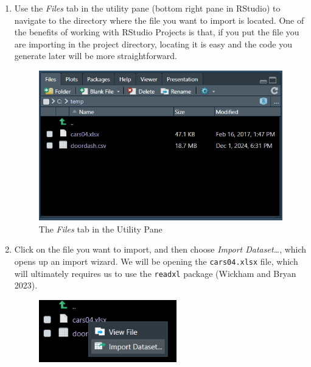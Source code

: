 \documentclass[
  letterpaper,
]{book}
\begin{document}
\begin{enumerate}
\def\labelenumi{\arabic{enumi}.}
\setcounter{enumi}{1}
\item
  Use the \emph{Files} tab in the utility pane (bottom right pane in
  RStudio) to navigate to the directory where the file you want to
  import is located. One of the benefits of working with RStudio
  Projects is that, if you put the file you are importing in the project
  directory, locating it is easy and the code you generate later will be
  more straightforward.

  \begin{figure}[H]

  {\centering \includegraphics[width=5.4375in,height=\textheight,keepaspectratio]{images/utilitypane.png}

  }

  \caption{The \emph{Files} tab in the Utility Pane}

  \end{figure}%
\item
  Click on the file you want to import, and then choose \emph{Import
  Dataset\ldots{}}, which opens up an import wizard. We will be opening
  the \texttt{cars04.xlsx} file, which will ultimately requires us to
  use the \texttt{readxl} package (Wickham and Bryan 2023).

  \begin{figure}[H]

  {\centering \includegraphics[width=2.35417in,height=\textheight,keepaspectratio]{images/import_dataset.png}

}
\end{figure}
\end{enumerate}
\end{document}
